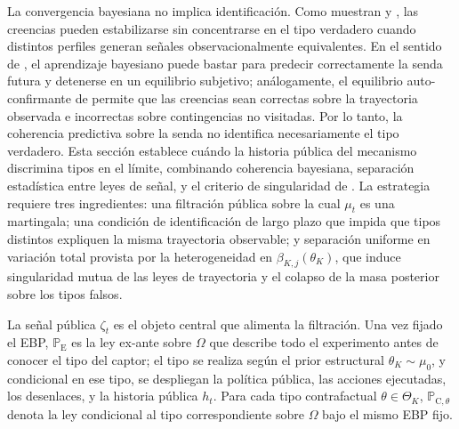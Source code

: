 \documentclass[review,authoryear,12pt]{elsarticle}
\theoremstyle{plain}
\theoremstyle{definition}
\newcommand{\ProbE}{\mathbb{P}_{\mathrm{E}}}
\newcommand{\ProbC}[1]{\mathbb{P}_{\mathrm{C},#1}}
\newcommand{\ThetaK}{\Theta_K}
\newcommand{\1}{\mathbf{1}}
\begin{document}
La convergencia bayesiana no implica identificación. Como muestran \citet{Doob1953Stochastic} y \citet{BlackwellDubins1962}, las creencias pueden estabilizarse sin concentrarse en el tipo verdadero cuando distintos perfiles generan señales observacionalmente equivalentes. En el sentido de \citet{KalaiLehrer1993}, el aprendizaje bayesiano puede bastar para predecir correctamente la senda futura y detenerse en un equilibrio subjetivo; análogamente, el equilibrio auto-confirmante de \citet{FudenbergLevine1993SCE} permite que las creencias sean correctas sobre la trayectoria observada e incorrectas sobre contingencias no visitadas. Por lo tanto, la coherencia predictiva sobre la senda no identifica necesariamente el tipo verdadero. Esta sección establece cuándo la historia pública del mecanismo discrimina tipos en el límite, combinando coherencia bayesiana, separación estadística entre leyes de señal, y el criterio de singularidad de \citet{Kakutani1948}. La estrategia requiere tres ingredientes: una filtración pública sobre la cual $\mu_t$ es una martingala; una condición de identificación de largo plazo que impida que tipos distintos expliquen la misma trayectoria observable; y separación uniforme en variación total provista por la heterogeneidad en $\beta_{K,j}(\theta_K)$, que induce singularidad mutua de las leyes de trayectoria y el colapso de la masa posterior sobre los tipos falsos.

La señal pública $\zeta_t$ es el objeto central que alimenta la filtración. Una vez fijado el EBP, $\ProbE$ es la ley ex-ante sobre $\Omega$ que describe todo el experimento antes de conocer el tipo del captor; el tipo se realiza según el prior estructural $\theta_K\sim\mu_0$, y condicional en ese tipo, se despliegan la política pública, las acciones ejecutadas, los desenlaces, y la historia pública $h_t$. Para cada tipo contrafactual $\theta\in\ThetaK$, $\ProbC{\theta}$ denota la ley condicional al tipo correspondiente sobre $\Omega$ bajo el mismo EBP fijo.
\end{document}
